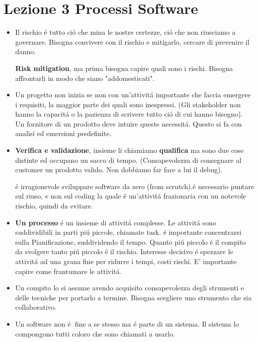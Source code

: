 \documentclass[10pt]{article}
\begin{document}
\section{Lezione 3 Processi Software}
\begin{itemize}
	\item Il rischio \'e tutto ci\'o che mina le nostre certezze, ci\'o che non 
	riusciamo a governare. Bisogna convivere con
	il rischio e mitigarlo, cercare di prevenire il danno.
	
	\textbf{Risk mitigation}, ma prima bisogna capire quali sono i rischi.
	Bisogna affrontarli in modo che siano "addomesticati".
	
	
	\item Un progetto non inizia se non con un'attivit\'a importante che faccia 
	emergere i requisiti, la maggior parte dei quali sono inespressi. (Gli 
	stakeholder non hanno la capacit\'a o la pazienza 
	di scrivere tutto ci\'o di cui hanno
	bisogno). Un fornitore di un prodotto deve intuire queste necessit\'a. 
	Questo si fa con analisi ed emersioni predefinite.
	
	\item \textbf{Verifica e validazione}, insieme li chiamiamo 
	\textbf{qualifica} ma sono due cose distinte ed occupano un sacco di
	tempo. (Consapevolezza di consegnare al customer un prodotto valido. Non 
	dobbiamo far fare a lui il debug).
	
	\'e irragionevole sviluppare software da zero (from scrutch).\'e necessario 
	puntare sul riuso, e non sul coding la quale \'e un'attivit\'a frazionaria 
	con un notevole rischio, quindi da evitare.
	
	\item \textbf{Un processo} \'e un insieme di attivit\'a complesse. Le 
	attivit\'a sono suddividibili in parti pi\'u piccole, chiamate
	task. \'e importante concentrarsi sulla Pianificazione, suddividendo il 
	tempo.
	 Quanto pi\'u piccolo \'e il compito da svolgere tanto pi\'u
	piccolo \'e il rischio. Interesse decisivo \'e spezzare le attivit\'a ad 
	una grana fine per ridurre i tempi, costi rischi. E' importante capire come 
	frantumare le attivit\'a.  
	
	
	\item  Un compito lo si assume avendo acquisito consapevolezza degli 
	strumenti e delle tecniche per portarlo
	a termine. Bisogna scegliere uno strumento che sia collaborativo.
	
	\item Un software non \'e fine a se stesso ma \'e parte di un sistema. Il 
	sistema lo compongono tutti coloro che sono chiamati a usarlo. 
	

\end{itemize}
\end{document}
